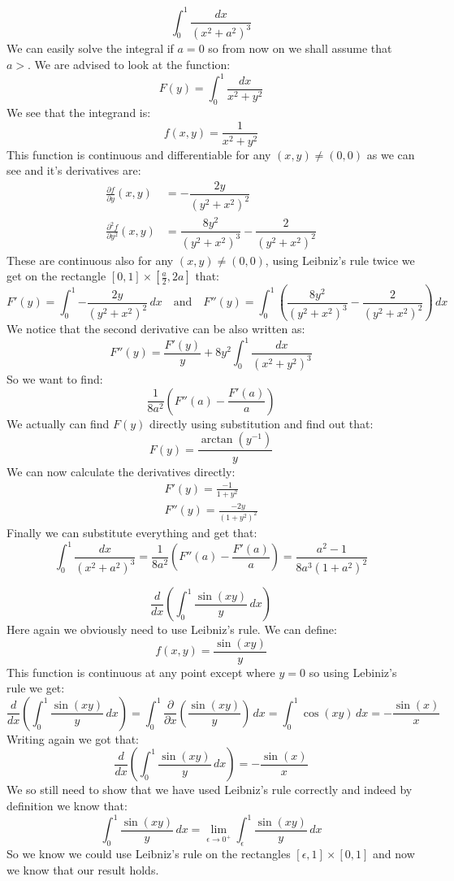 \documentclass{article}
\theoremstyle{plain}
\begin{document}
	\[
		\int_{0}^{1}{\frac{dx}{(x^2+a^2)^3}}
	\]
	We can easily solve the integral if $a = 0$ so from now on we shall assume
	that $a > $. We are advised to look at the function:
	\[
		F(y) = \int_{0}^{1}{\frac{dx}{x^2+y^2}}
	\]
	We see that the integrand is:
	\[
		f(x,y) = \frac{1}{x^2+y^2}
	\]
	This function is continuous and differentiable for any $(x,y) \neq (0,0)$
	as we can see and it's derivatives are:
	\begin{align*}
		\frac{\partial f}{\partial y} (x,y) &= 
		-\dfrac{2y}{\left(y^2+x^2\right)^2} \\
		\frac{\partial^2 f}{\partial y^2} (x,y) &= 
		\dfrac{8y^2}{\left(y^2+x^2\right)^3}-\dfrac{2}{\left(y^2+x^2\right)^2}
	\end{align*}
	These are continuous also for any $(x,y) \neq (0,0)$, using Leibniz's
	rule twice we get on the rectangle $[0,1]\times[\frac{a}{2},2a]$ that:
	\[
		F'(y) = \int_{0}^{1}{-\dfrac{2y}{\left(y^2+x^2\right)^2}\,dx}
		\quad\text{and}\quad
		F''(y) = \int_{0}^{1}{\left(
		\dfrac{8y^2}{\left(y^2+x^2\right)^3}-\dfrac{2}
		{\left(y^2+x^2\right)^2}\right)\,dx}
	\]
	We notice that the second derivative can be also written as:
	\[
		F''(y) = \frac{F'(y)}{y} + 8y^2\int_{0}^{1}{\frac{dx}{(x^2+y^2)^3}}
	\]
	So we want to find:
	\[
		\frac{1}{8a^2}\left(F''(a) - \frac{F'(a)}{a}\right)
	\]
	We actually can find $F(y)$ directly using substitution and find
	out that:
	\[
		F(y) = \frac{\arctan(y^{-1})}{y}
	\]
	We can now calculate the derivatives directly:
	\begin{align*}
		F'(y) = \frac{-1}{1+y^2} \\
		F''(y) = \frac{-2y}{(1+y^2)^2}
	\end{align*}
	Finally we can substitute everything and get that:
	\[
		\int_{0}^{1}{\frac{dx}{(x^2+a^2)^3}} =
		\frac{1}{8a^2}\left(F''(a) - \frac{F'(a)}{a}\right) = 
		\frac{a^2-1}{8a^3(1+a^2)^2}
	\]
	
	\newpage
	
	\[
		\frac{d}{dx}\left(\int_{0}^{1}{\frac{\sin(xy)}{y}\,dx}\right)
	\]
	Here again we obviously need to use Leibniz's rule. We can define:
	\[
		f(x,y) = \frac{\sin(xy)}{y}
	\]
	This function is continuous at any point except where $y = 0$ so using
	Lebiniz's rule we get:
	\[
		\frac{d}{dx}\left(\int_{0}^{1}{\frac{\sin(xy)}{y}\,dx}\right) = 
		\int_{0}^{1}{\frac{\partial}{\partial x}
		\left(\frac{\sin(xy)}{y}\right)\,dx} = 
		\int_{0}^{1}{\cos(xy)\,dx} = -\frac{\sin(x)}{x}
	\]
	Writing again we got that:
	\[
		\frac{d}{dx}\left(\int_{0}^{1}{\frac{\sin(xy)}{y}\,dx}\right) = 
		-\frac{\sin(x)}{x}
	\]
	We so still need to show that we have used Leibniz's rule correctly and
	indeed by definition we know that:
	\[
		\int_{0}^{1}{\frac{\sin(xy)}{y}\,dx} = 
		\lim_{\epsilon\to0^+}{\int_{\epsilon}^{1}{\frac{\sin(xy)}{y}\,dx}}
	\]
	So we know we could use Leibniz's rule on the rectangles 
	$[\epsilon,1]\times[0,1]$ and now we know that our result holds.
	
\end{document}

